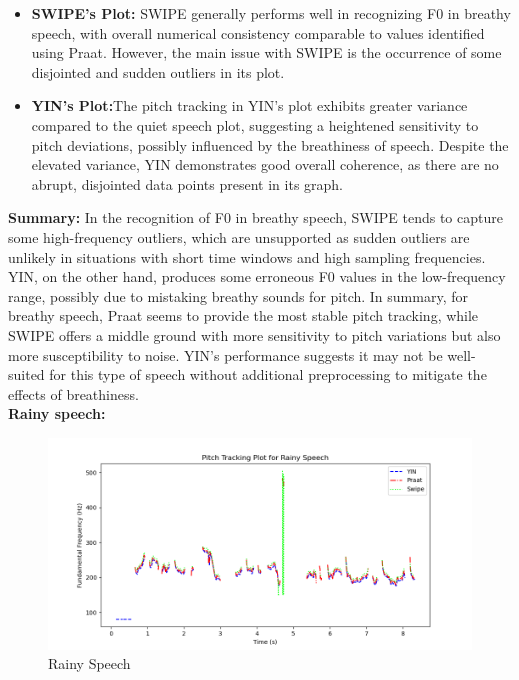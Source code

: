 \documentclass{../labbook}
\begin{document}
\begin{solution}
\begin{itemize}
    \item \textbf{SWIPE's Plot:} SWIPE generally performs well in recognizing F0 in breathy speech, with overall numerical consistency comparable to values identified using Praat. However, the main issue with SWIPE is the occurrence of some disjointed and sudden outliers in its plot.



    \item \textbf{YIN's Plot:}The pitch tracking in YIN's plot exhibits greater variance compared to the quiet speech plot, suggesting a heightened sensitivity to pitch deviations, possibly influenced by the breathiness of speech. Despite the elevated variance, YIN demonstrates good overall coherence, as there are no abrupt, disjointed data points present in its graph.

\end{itemize}

\textbf{Summary:} In the recognition of F0 in breathy speech, SWIPE tends to capture some high-frequency outliers, which are unsupported as sudden outliers are unlikely in situations with short time windows and high sampling frequencies. YIN, on the other hand, produces some erroneous F0 values in the low-frequency range, possibly due to mistaking breathy sounds for pitch. In summary, for breathy speech, Praat seems to provide the most stable pitch tracking, while SWIPE offers a middle ground with more sensitivity to pitch variations but also more susceptibility to noise. YIN's performance suggests it may not be well-suited for this type of speech without additional preprocessing to mitigate the effects of breathiness.\\


\textbf{Rainy speech:}
\begin{figure}[h]
    \centering
    \includegraphics[width=0.8\linewidth]{recording4_rainy_fm_pitch_plot.png}
    \caption{Rainy Speech}
    \label{fig:enter-label}
\end{figure}


\end{solution}
\end{document}
